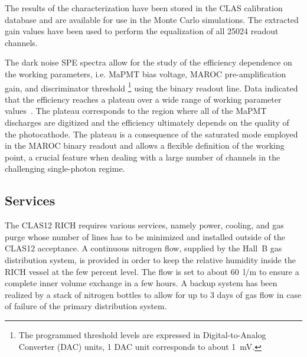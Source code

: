 \documentclass[5p,times,twocolumn]{elsarticle}
\begin{document}
The results of the characterization have been stored in the CLAS calibration database and are available for use in
the Monte Carlo simulations. The extracted gain values have been used to perform the equalization of all 25024
readout channels.


The dark noise SPE spectra allow for the study of the efficiency dependence on the working parameters, i.e. MaPMT
bias voltage, MAROC pre-amplification gain, and discriminator threshold \footnote{The programmed threshold
levels are expressed in Digital-to-Analog Converter (DAC) units, 1 DAC unit corresponds to about 1~mV.} using the
binary readout line. Data indicated that the efficiency reaches a plateau over a wide range of working parameter
values~\cite{Ref:RICHElectro}. %
The plateau corresponds to the region where all of the MaPMT discharges  are digitized and the efficiency ultimately
depends on the quality of the photocathode. The plateau is a consequence of the saturated mode employed in the
MAROC binary readout and allows a flexible definition of the working point, a crucial feature when dealing with a large
number of channels in the challenging single-photon regime.

\clearpage

\subsection{Services}

The CLAS12 RICH requires various services, namely power, cooling, and gas purge whose number of lines has to be
minimized and installed outside of the CLAS12 acceptance. A continuous nitrogen flow, supplied by the Hall~B gas
distribution system, is provided in order to keep the relative humidity inside the RICH vessel at the few percent
level. The flow is set to about 60~l/m to ensure a complete inner volume exchange in a few hours. 
A backup system has been realized by a stack of nitrogen bottles to allow for up to 3 days of gas flow in case of
failure of the primary distribution system.
\end{document}
